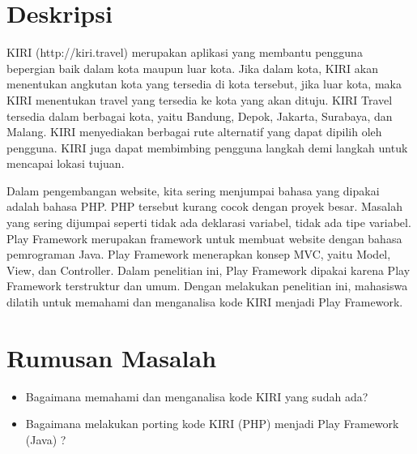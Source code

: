 \documentclass[a4paper,twoside]{article}
\begin{document}
\title{\@judultopik}
\author{\nama \textendash \@npm} 

\newcommand{\nama}{Steven Sutana}
\newcommand{\@npm}{2012730046}
\newcommand{\@judultopik}{Porting PHP menjadi Play Framework (Studi Kasus : KIRI \textit{Front-End})} %
\newcommand{\jumpemb}{1} %
\newcommand{\tanggal}{26/08/2015}
\maketitle


\section{Deskripsi}
KIRI (http://kiri.travel) merupakan aplikasi yang membantu pengguna bepergian baik dalam kota maupun luar kota. Jika dalam kota, KIRI akan menentukan angkutan kota yang tersedia di kota tersebut, jika luar kota, maka KIRI menentukan travel yang tersedia ke kota yang akan dituju. KIRI Travel tersedia dalam berbagai kota, yaitu Bandung, Depok, Jakarta, Surabaya, dan Malang. KIRI menyediakan berbagai rute alternatif yang dapat dipilih oleh pengguna. KIRI juga dapat membimbing pengguna langkah demi langkah untuk mencapai lokasi tujuan. 

Dalam pengembangan website, kita sering menjumpai bahasa yang dipakai adalah bahasa PHP. PHP tersebut kurang cocok dengan proyek besar. Masalah yang sering dijumpai seperti tidak ada deklarasi variabel, tidak ada tipe variabel. Play Framework merupakan framework untuk membuat website dengan bahasa pemrograman Java. Play Framework menerapkan konsep MVC, yaitu Model, View, dan Controller. Dalam penelitian ini, Play Framework dipakai karena Play Framework terstruktur dan umum. Dengan melakukan penelitian ini, mahasiswa dilatih untuk memahami dan menganalisa kode KIRI menjadi Play Framework.

\section{Rumusan Masalah}
\begin{itemize}
	\item Bagaimana memahami dan menganalisa kode KIRI yang sudah ada?
	\item Bagaimana melakukan porting kode KIRI (PHP) menjadi Play Framework (Java) ?
\end{itemize}
\end{document}

